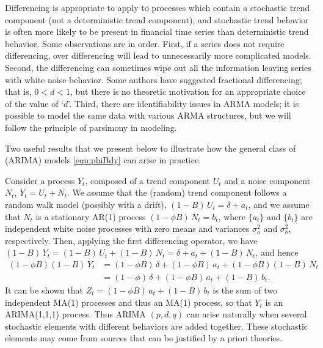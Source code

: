 Differencing is appropriate to apply to processes which contain a stochastic trend component (not a deterministic trend component), and stochastic trend behavior is often more likely to be present in financial time series than deterministic trend behavior. Some observations are in order. First, if a series does not require differencing, over differencing will lead to unnecessarily more complicated models. Second, the differencing can sometimes wipe out all the information leaving series with white noise behavior. Some authors have suggested fractional differencing; that is, $0<d<1$, but there is no theoretic motivation for an appropriate choice of the value of `$d$'. Third, there are identifiability issues in ARMA models; it is possible to model the same data with various ARMA structures, but we will follow the principle of parsimony in modeling. 


Two useful results that we present below to illustrate how the general class of (ARIMA) models \eqref{eqn:phiBdy} can arise in practice.


\begin{result}[Aggregation]
Consider a process $Y_t$, composed of a trend component $U_t$ and a noise component $N_t$, $Y_t = U_t + N_t$. We assume that the (random) trend component follows a random walk model (possibly with a drift), $(1 - B)\, U_t = \delta + a_t$, and we assume that $N_t$ is a stationary AR(1) process $(1 - \phi B)\, N_t = b_t$, where $\{ a_t \}$ and $\{ b_t \}$ are independent white noise processes with zero means and variances $\sigma_a^2$ and $\sigma_b^2$, respectively. Then, applying the first differencing operator, we have $(1 - B)\, Y_t = (1 - B)\, U_t + (1 - B)\, N_t = \delta + a_t + (1 - B)\, N_t$, and hence
	\begin{equation} \label{eqn:bphi}
	\begin{aligned}
	(1 - \phi B)(1 - B)\,Y_t&= (1 - \phi B)\, \delta + (1 - \phi B)\, a_t + (1 - \phi B)(1 - B)\, N_t \\
	&= (1 - \phi)\, \delta + (1 - \phi B)\, a_t + (1 - B)\, b_t.
	\end{aligned}
	\end{equation}
It can be shown that $Z_t = (1 - \phi B)\, a_t + (1 - B)\, b_t$ is the sum of two independent MA(1) processes and thus an MA(1) process, so that $Y_t$ is an ARIMA(1,1,1) process. Thus ARIMA $(p, d, q)$ can arise naturally when several stochastic elements with different behaviors are added together. These stochastic elements may come from sources that can be justified by a priori theories. \xqed
\end{result}


